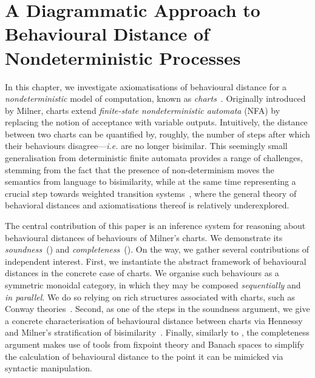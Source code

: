\chapter{A Diagrammatic Approach to Behavioural Distance of Nondeterministic Processes}
\label{chapter3}

In this chapter, we investigate axiomatisations of behavioural distance for a {\em nondeterministic} model of computation, known as \emph{charts}~\cite{Milner:1984:Complete}. Originally introduced by Milner, charts extend \emph{finite-state nondeterministic automata} (NFA) by replacing the notion of acceptance with variable outputs. Intuitively, the distance between two charts can be quantified by, roughly, the number of steps after which their behaviours disagree---\emph{i.e.} are no longer bisimilar. This seemingly small generalisation from deterministic finite automata provides a range of challenges, stemming from the fact that the presence of non-determinism moves the semantics from language to bisimilarity, while at the same time representing a crucial step towards weighted transition systems~\cite{Larsen:2011:Metrics}, where the general theory of behavioral distances and axiomatisations thereof is relatively underexplored. 


The central contribution of this paper is an inference system for reasoning about behavioural distances of behaviours of Milner's charts. We demonstrate its \emph{soundness}~() and \emph{completeness}~(). On the way, we gather several contributions of independent interest. First, we instantiate the abstract framework of behavioural distances in the concrete case of charts. We organise such behaviours as a symmetric monoidal category, in which they may be composed \emph{sequentially} and \emph{in parallel}. We do so relying on rich structures associated with charts, such as Conway theories~\cite{Bloom:1993:Iteration,Esik:1999:Group}. Second, as one of the steps in the soundness argument, we give a concrete characterisation of behavioural distance between charts via Hennessy and Milner's stratification of bisimilarity~\cite{hennessy:1985:algebraic}. Finally, similarly to , the completeness argument makes use of tools from fixpoint theory and Banach spaces to simplify the calculation of behavioural distance to the point it can be mimicked via syntactic manipulation.

